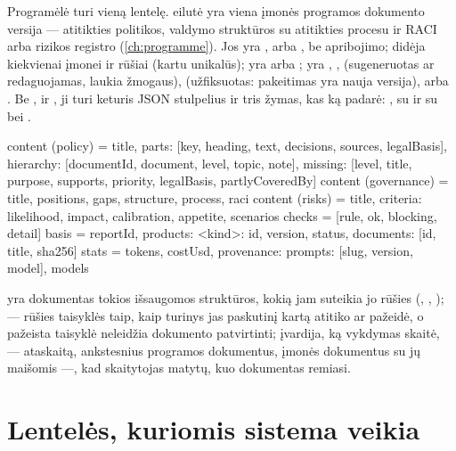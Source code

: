 Programėlė  turi vieną lentelę.  eilutė yra viena įmonės
programos dokumento versija --- atitikties politikos, valdymo struktūros su atitikties procesu
ir RACI arba rizikos registro (\cref{ch:programme}). Jos  yra ,
 arba , be apribojimo;  didėja kiekvienai įmonei ir
rūšiai (kartu unikalūs);  yra  arba ;  yra
, ,  (sugeneruotas ar redaguojamas, laukia žmogaus),
 (užfiksuotas: pakeitimas yra nauja versija),  arba
. Be ,  ir , ji turi keturis JSON stulpelius
ir tris žymas, kas ką padarė: ,  su  ir
 su  bei .

\begin{codeblock}
content (policy)     = {title,
                        parts: [{key, heading, text, decisions, sources,
                                 legalBasis}],
                        hierarchy: [{documentId, document, level, topic, note}],
                        missing: [{level, title, purpose, supports, priority,
                                   legalBasis, partlyCoveredBy}]}
content (governance) = {title, positions, gaps, structure, process, raci}
content (risks)      = {title, criteria: {likelihood, impact, calibration},
                        appetite, scenarios}
checks = [{rule, ok, blocking, detail}]
basis  = {reportId, products: {<kind>: {id, version, status}},
          documents: [{id, title, sha256}]}
stats  = {tokens, costUsd, provenance: {prompts: [{slug, version, model}],
                                        models}}
\end{codeblock}

 yra dokumentas tokios išsaugomos struktūros, kokią jam suteikia jo rūšies
 (, , );
 --- rūšies taisyklės taip, kaip turinys jas paskutinį kartą atitiko ar pažeidė,
o pažeista  taisyklė neleidžia dokumento patvirtinti;  įvardija, ką
vykdymas skaitė, --- ataskaitą, ankstesnius programos dokumentus, įmonės dokumentus su jų maišomis ---, kad
skaitytojas matytų, kuo dokumentas remiasi.

\section{Lentelės, kuriomis sistema veikia}\label{sec:data:ops}

